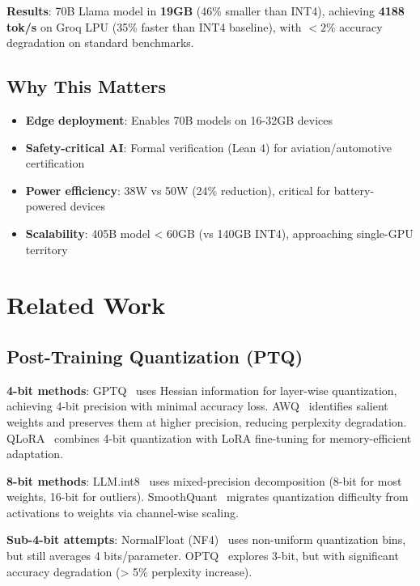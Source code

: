 \documentclass{article}
\begin{document}
\textbf{Results}: 70B Llama model in \textbf{19GB} (46\% smaller than INT4), achieving \textbf{4188 tok/s} on Groq LPU (35\% faster than INT4 baseline), with $< 2\%$ accuracy degradation on standard benchmarks.

\subsection{Why This Matters}

\begin{itemize}
    \item \textbf{Edge deployment}: Enables 70B models on 16-32GB devices
    \item \textbf{Safety-critical AI}: Formal verification (Lean 4) for aviation/automotive certification
    \item \textbf{Power efficiency}: 38W vs 50W (24\% reduction), critical for battery-powered devices
    \item \textbf{Scalability}: 405B model < 60GB (vs 140GB INT4), approaching single-GPU territory
\end{itemize}

\section{Related Work}
\label{sec:related}

\subsection{Post-Training Quantization (PTQ)}

\textbf{4-bit methods}: GPTQ~\cite{frantar2023gptq} uses Hessian information for layer-wise quantization, achieving 4-bit precision with minimal accuracy loss. AWQ~\cite{lin2023awq} identifies salient weights and preserves them at higher precision, reducing perplexity degradation. QLoRA~\cite{dettmers2023qlora} combines 4-bit quantization with LoRA fine-tuning for memory-efficient adaptation.

\textbf{8-bit methods}: LLM.int8~\cite{dettmers2022llm8bit} uses mixed-precision decomposition (8-bit for most weights, 16-bit for outliers). SmoothQuant~\cite{xiao2023smoothquant} migrates quantization difficulty from activations to weights via channel-wise scaling.

\textbf{Sub-4-bit attempts}: NormalFloat (NF4)~\cite{dettmers2023qlora} uses non-uniform quantization bins, but still averages 4 bits/parameter. OPTQ~\cite{frantar2023gptq} explores 3-bit, but with significant accuracy degradation (> 5\% perplexity increase).
\end{document}
